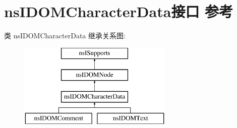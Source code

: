 \hypertarget{interfacens_i_d_o_m_character_data}{}\section{ns\+I\+D\+O\+M\+Character\+Data接口 参考}
\label{interfacens_i_d_o_m_character_data}
类 ns\+I\+D\+O\+M\+Character\+Data 继承关系图\+:\begin{figure}[H]
\begin{center}
\leavevmode
\includegraphics[height=4.000000cm]{interfacens_i_d_o_m_character_data}
\end{center}
\end{figure}
